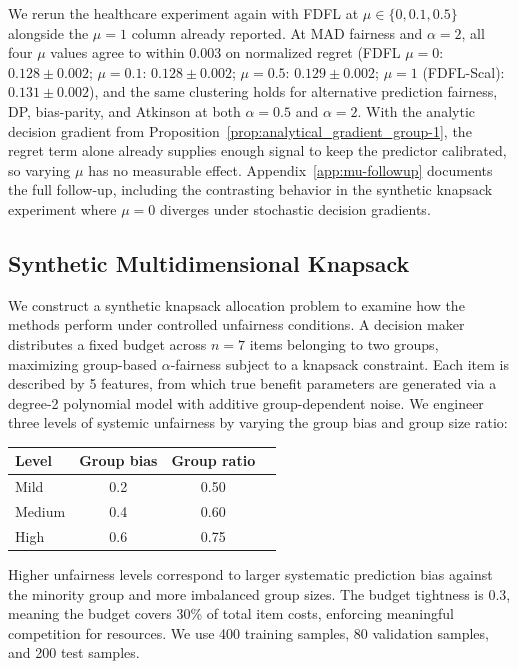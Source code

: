 \documentclass[ijoc,sglanonrev]{informs4}
\begin{document}
We rerun the healthcare experiment again with FDFL at $\mu \in \{0, 0.1, 0.5\}$
alongside the $\mu = 1$ column already reported. At MAD fairness
and $\alpha = 2$, all four $\mu$ values agree to within $0.003$ on
normalized regret (FDFL $\mu=0$: $0.128 \pm 0.002$; $\mu=0.1$:
$0.128 \pm 0.002$; $\mu=0.5$: $0.129 \pm 0.002$;
$\mu=1$ (FDFL-Scal): $0.131 \pm 0.002$), and the same clustering
holds for alternative prediction fairness, DP, bias-parity, and Atkinson at both $\alpha = 0.5$ and
$\alpha = 2$. With the analytic decision gradient from
Proposition~\ref{prop:analytical_gradient_group-1}, the regret term
alone already supplies enough signal to keep the predictor
calibrated, so varying $\mu$ has no measurable effect.
Appendix~\ref{app:mu-followup} documents the full follow-up,
including the contrasting behavior in the synthetic knapsack
experiment where $\mu = 0$ diverges under stochastic decision
gradients.




\subsection{Synthetic Multidimensional Knapsack} \label{sec:exp-knapsack}

We construct a synthetic knapsack allocation problem to examine how the methods perform under controlled unfairness conditions. A decision maker distributes a fixed budget across $n = 7$ items belonging to two groups, maximizing group-based $\alpha$-fairness subject to a knapsack constraint. Each item is described by 5 features, from which true benefit parameters are generated via a degree-2 polynomial model with additive group-dependent noise. We engineer three levels of systemic unfairness by varying the group bias and group size ratio:

\begin{center}
\small
\begin{tabular}{lccc}
\toprule
Level & Group bias & Group ratio \\
\midrule
Mild   & 0.2 & 0.50 \\
Medium & 0.4  & 0.60 \\
High   & 0.6  & 0.75 \\
\bottomrule
\end{tabular}
\end{center}

Higher unfairness levels correspond to larger systematic prediction bias against the minority group and more imbalanced group sizes. The budget tightness is 0.3, meaning the budget covers 30\% of total item costs, enforcing meaningful competition for resources. We use 400 training samples, 80 validation samples, and 200 test samples.
\end{document}
